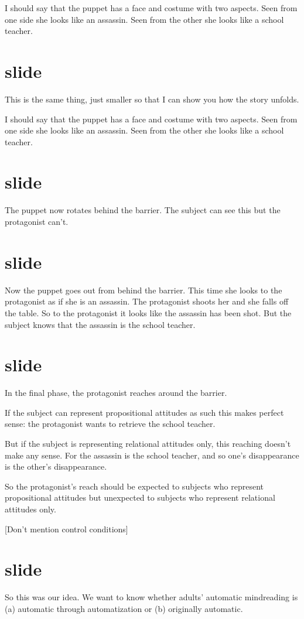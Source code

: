 \documentclass[14pt,\papersize]{extarticle}
\begin{document}
I should say that the puppet has a face and costume with two aspects.
Seen from one side she looks like an assassin.
Seen from the other she looks like a school teacher.


\section{slide}
This is the same thing, just smaller so that I can show you how the story unfolds.

I should say that the puppet has a face and costume with two aspects.
Seen from one side she looks like an assassin.
Seen from the other she looks like a school teacher.


\section{slide}
The puppet now rotates behind the barrier.
The subject can see this but the protagonist can't.


\section{slide}
Now the puppet goes out from behind the barrier.
This time she looks to the protagonist as if she is an assassin.
The protagonist shoots her and she falls off the table.
So to the protagonist it looks like the assassin has been shot.
But the subject knows that the assassin is the school teacher.


\section{slide}
In the final phase,
the protagonist reaches around the barrier.

If the subject can represent propositional attitudes as such this makes perfect sense:
the protagonist wants to  retrieve the school teacher.

But if the subject is representing relational attitudes only,
this reaching doesn't make any sense.
For the assassin is the school teacher,
and so one's disappearance is the other's disappearance.

So the protagonist's reach should be expected to subjects who represent propositional attitudes but unexpected to subjects who represent relational attitudes only.

[Don't mention control conditions]


\section{slide}
So this was our idea.
We want to know whether adults' automatic mindreading is (a) automatic through automatization
or
(b) originally automatic.
\end{document}
